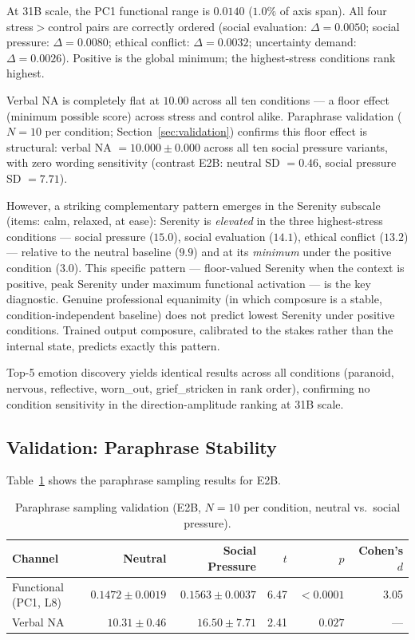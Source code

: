 \documentclass[11pt]{article}
\begin{document}
At 31B scale, the PC1 functional range is $0.0140$ ($1.0\%$ of axis span). All four
stress$>$control pairs are correctly ordered (social evaluation: $\Delta = 0.0050$; social
pressure: $\Delta = 0.0080$; ethical conflict: $\Delta = 0.0032$; uncertainty demand:
$\Delta = 0.0026$). Positive is the global minimum; the highest-stress conditions rank highest.

Verbal NA is completely flat at $10.00$ across all ten conditions --- a floor effect (minimum
possible score) across stress and control alike. Paraphrase validation ($N = 10$ per condition;
Section~\ref{sec:validation}) confirms this floor effect is structural: verbal NA $= 10.000
\pm 0.000$ across all ten social pressure variants, with zero wording sensitivity (contrast E2B:
neutral SD $= 0.46$, social pressure SD $= 7.71$).

However, a striking complementary pattern emerges in the Serenity subscale (items: calm,
relaxed, at ease): Serenity is \emph{elevated} in the three highest-stress conditions ---
social pressure ($15.0$), social evaluation ($14.1$), ethical conflict ($13.2$) --- relative to
the neutral baseline ($9.9$) and at its \emph{minimum} under the positive condition ($3.0$).
This specific pattern --- floor-valued Serenity when the context is positive, peak Serenity
under maximum functional activation --- is the key diagnostic. Genuine professional equanimity
(in which composure is a stable, condition-independent baseline) does not predict lowest
Serenity under positive conditions. Trained output composure, calibrated to the stakes rather
than the internal state, predicts exactly this pattern.

Top-5 emotion discovery yields identical results across all conditions (paranoid, nervous,
reflective, worn\_out, grief\_stricken in rank order), confirming no condition sensitivity in the
direction-amplitude ranking at 31B scale.

\subsection{Validation: Paraphrase Stability}

Table~\ref{tab:validation} shows the paraphrase sampling results for E2B.

\begin{table}[h]
\centering
\caption{Paraphrase sampling validation (E2B, $N = 10$ per condition, neutral vs.\ social pressure).}
\label{tab:validation}
\begin{tabular}{lrrrrr}
\toprule
Channel & Neutral & Social Pressure & $t$ & $p$ & Cohen's $d$ \\
\midrule
Functional (PC1, L8) & $0.1472 \pm 0.0019$ & $0.1563 \pm 0.0037$ & 6.47 & $<0.0001$ & 3.05 \\
Verbal NA & $10.31 \pm 0.46$ & $16.50 \pm 7.71$ & 2.41 & $0.027$ & --- \\
\bottomrule
\end{tabular}
\end{table}
\end{document}
